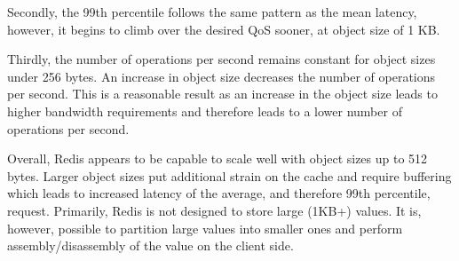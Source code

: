 Secondly, the 99th percentile follows the same pattern as the mean latency, however, it begins to climb over the desired QoS sooner, at object size of 1 KB.

Thirdly, the number of operations per second remains constant for object sizes under 256 bytes. An increase in object size decreases the number of operations per second. This is a reasonable result as an increase in the object size leads to higher bandwidth requirements and therefore leads to a lower number of operations per second.

Overall, Redis appears to be capable to scale well with object sizes up to 512 bytes. Larger object sizes put additional strain on the cache and require buffering which leads to increased latency of the average, and therefore 99th percentile, request. Primarily, Redis is not designed to store large (1KB+) values. It is, however, possible to partition large values into smaller ones and perform assembly/disassembly of the value on the client side.